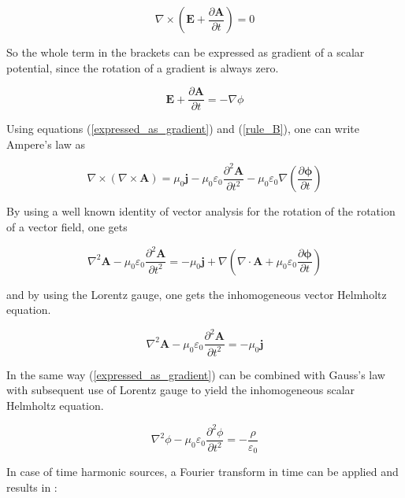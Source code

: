 \documentclass[a4paper,11pt]{report}
\begin{document}
\begin{equation}
\nabla \times \left( \mathbf{E}+\frac{\partial \mathbf{A}}{\partial t} \right) = 0
\end{equation}

So the whole term in the brackets can be expressed as gradient of a scalar potential, since the rotation of a gradient is always zero.

\begin{equation}\label{expressed_as_gradient}
\mathbf{E}+\frac{\partial \mathbf{A}}{\partial t} = -\nabla \phi
\end{equation}

Using equations (\ref{expressed_as_gradient})  and (\ref{rule_B}), one can write Ampere's law as

\begin{equation}
\nabla \times ( \nabla \times \mathbf{A} ) =\mu_0 \mathbf{j}-\mu_0 \varepsilon_0 \frac{\partial^2 \mathbf{A}}{\partial t^2}- \mu_0 \varepsilon_0 \nabla \left( \frac{\partial \mathbf{\phi}}{\partial t} \right)
\end{equation}


By using a well known identity of vector analysis for the rotation of the rotation of a vector field, one gets

\begin{equation}
\nabla^2 \mathbf{A} - \mu_0 \varepsilon_0 \frac{\partial^2 \mathbf{A}}{\partial t^2} =-\mu_0 \mathbf{j}+\nabla \left( \nabla \cdot \mathbf{A} + \mu_0 \varepsilon_0 \frac{\partial \mathbf{\phi}}{\partial t} \right)
\end{equation}


and by using the Lorentz gauge, one gets the inhomogeneous vector Helmholtz equation.

\begin{equation}
\nabla^2 \mathbf{A} - \mu_0 \varepsilon_0 \frac{\partial^2 \mathbf{A}}{\partial t^2} =-\mu_0 \mathbf{j}
\end{equation}



In the same way (\ref{expressed_as_gradient}) can be combined with Gauss's law with subsequent use of Lorentz gauge to yield the inhomogeneous scalar Helmholtz equation.

\begin{equation}
\nabla^2 \phi - \mu_0 \varepsilon_0 \frac{\partial^2 \phi }{\partial t^2} =-\frac{\rho }{\varepsilon_0 }
\end{equation}

In case of time harmonic sources, a Fourier transform in time can be applied and results in :
\end{document}
